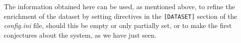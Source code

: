 
	
		
	
	

The information obtained here can be used, as mentioned above, to refine the enrichment of the dataset by setting directives in the \texttt{[DATASET]} section of the \textit{config.ini} file, should this be empty or only partially set, or to make the first conjectures about the system, as we have just seen.

